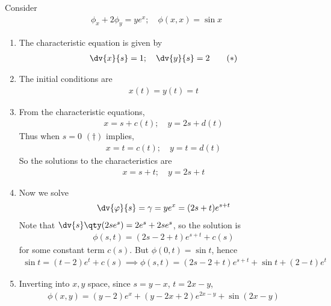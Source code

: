 \begin{example}
	Consider
	\begin{align*}
		\phi_x + 2 \phi_y = ye^x;\quad \phi(x,x) = \sin x
	\end{align*}
    \begin{enumerate}
        \item The characteristic equation is given by
        \begin{align*}
            \dv{x}{s} = 1;\quad \dv{y}{s} = 2 \tag{$\ast$}
        \end{align*}
        \item The initial conditions are
        \begin{align*}
            x(t) = y(t) = t \tag{$\dagger$}
        \end{align*}
        \item From the characteristic equations,
        \begin{align*}
            x = s + c(t);\quad y = 2s + d(t)
        \end{align*}
        Thus when $s = 0$ $(\dagger)$ implies,
        \begin{align*}
            x = t = c(t);\quad y = t = d(t)
        \end{align*}
        So the solutions to the characteristics are
        \begin{align*}
            x = s + t;\quad y = 2s + t
        \end{align*}
        \item Now we solve
        \begin{align*}
            \dv{\phi}{s} = \gamma = y e^x = (2s+t)e^{s+t}
        \end{align*}
        Note that $\dv{s} \qty(2se^s) = 2e^s + 2se^s$, so the solution is
        \begin{align*}
            \phi(s,t) = (2s - 2 + t)e^{s+t} + c(s)
        \end{align*}
        for some constant term $c(s)$.
        But $\phi(0,t) = \sin t$, hence
        \begin{align*}
            \sin t = (t-2)e^t + c(s) \implies \phi(s,t) = (2s-2+t)e^{s+t} + \sin t + (2-t)e^t
        \end{align*}
        \item Inverting into $x,y$ space, since $s = y - x$, $t = 2x - y$,
        \begin{align*}
            \phi(x,y) = (y-2)e^x + (y-2x+2)e^{2x-y} + \sin(2x-y)
        \end{align*}
    \end{enumerate} 
\end{example}

